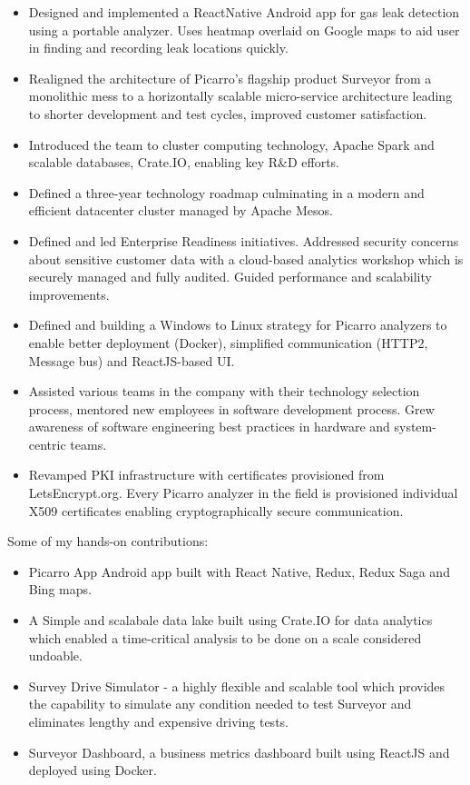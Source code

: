 \documentclass[a4paper, 14pt,line]{extarticle}
\begin{document}
\bigskip
\begin{itemize}
\item Designed and implemented a ReactNative Android app for gas leak
  detection using a portable analyzer. Uses heatmap overlaid on Google
  maps to aid user in finding and recording leak locations quickly.
\item Realigned the architecture of Picarro's flagship product
  Surveyor from a monolithic mess to a horizontally scalable
  micro-service architecture leading to shorter development and
  test cycles, improved customer satisfaction.
\item Introduced the team to cluster computing technology, Apache
  Spark and scalable databases, Crate.IO, enabling key R\&D
  efforts.
\item Defined a three-year technology roadmap culminating in a modern
  and efficient datacenter cluster managed by Apache Mesos.
\item Defined and led Enterprise Readiness initiatives. Addressed
  security concerns about sensitive customer data with a cloud-based
  analytics workshop which is securely managed and fully
  audited. Guided performance and scalability improvements.
\item Defined and building a Windows to Linux strategy for Picarro
  analyzers to enable better deployment (Docker), simplified
  communication (HTTP2, Message bus) and ReactJS-based UI.
\item Assisted various teams in the company with their technology
  selection process, mentored new employees in software development
  process. Grew awareness of software engineering best practices in
  hardware and system-centric teams.
\item Revamped PKI infrastructure with certificates provisioned from
  LetsEncrypt.org. Every Picarro analyzer in the field is provisioned
  individual X509 certificates enabling cryptographically secure
  communication.
\end{itemize}

\bigskip\noindent Some of my hands-on contributions:
\begin{itemize}
\item Picarro App \textemdash Android app built with React Native,
  Redux, Redux Saga and Bing maps.
\item A Simple and scalabale data lake built using Crate.IO for data
  analytics which enabled a time-critical analysis to be done on a
  scale considered undoable.
\item Survey Drive Simulator - a highly flexible and scalable tool
  which provides the capability to simulate any condition needed to
  test Surveyor and eliminates lengthy and expensive driving tests.
\item Surveyor Dashboard, a business metrics dashboard built using
  ReactJS and deployed using Docker.
\end{itemize}
\end{document}
